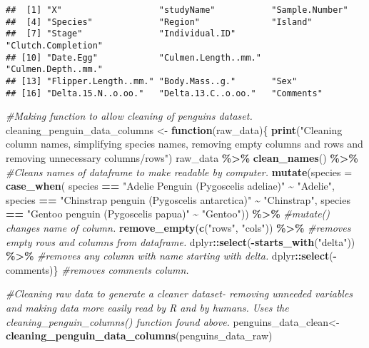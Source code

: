 \documentclass[
]{article}
\newenvironment{Shaded}{\begin{snugshade}}{\end{snugshade}}
\newcommand{\AttributeTok}[1]{\textcolor[rgb]{0.13,0.29,0.53}{#1}}
\newcommand{\CommentTok}[1]{\textcolor[rgb]{0.56,0.35,0.01}{\textit{#1}}}
\newcommand{\ControlFlowTok}[1]{\textcolor[rgb]{0.13,0.29,0.53}{\textbf{#1}}}
\newcommand{\FunctionTok}[1]{\textcolor[rgb]{0.13,0.29,0.53}{\textbf{#1}}}
\newcommand{\NormalTok}[1]{#1}
\newcommand{\OtherTok}[1]{\textcolor[rgb]{0.56,0.35,0.01}{#1}}
\newcommand{\SpecialCharTok}[1]{\textcolor[rgb]{0.81,0.36,0.00}{\textbf{#1}}}
\newcommand{\StringTok}[1]{\textcolor[rgb]{0.31,0.60,0.02}{#1}}
\begin{document}
\begin{verbatim}
##  [1] "X"                   "studyName"           "Sample.Number"      
##  [4] "Species"             "Region"              "Island"             
##  [7] "Stage"               "Individual.ID"       "Clutch.Completion"  
## [10] "Date.Egg"            "Culmen.Length..mm."  "Culmen.Depth..mm."  
## [13] "Flipper.Length..mm." "Body.Mass..g."       "Sex"                
## [16] "Delta.15.N..o.oo."   "Delta.13.C..o.oo."   "Comments"
\end{verbatim}

\begin{Shaded}
\begin{Highlighting}[]
\CommentTok{\#Making function to allow cleaning of penguins dataset.}
\NormalTok{cleaning\_penguin\_data\_columns }\OtherTok{\textless{}{-}} \ControlFlowTok{function}\NormalTok{(raw\_data)\{}
  \FunctionTok{print}\NormalTok{(}\StringTok{"Cleaning column names, simplifying species names, removing empty columns and rows and removing unnecessary columns/rows"}\NormalTok{)}
\NormalTok{  raw\_data }\SpecialCharTok{\%\textgreater{}\%} 
    \FunctionTok{clean\_names}\NormalTok{() }\SpecialCharTok{\%\textgreater{}\%} \CommentTok{\#Cleans names of dataframe to make readable by computer.}
    \FunctionTok{mutate}\NormalTok{(}\AttributeTok{species =} \FunctionTok{case\_when}\NormalTok{(}
\NormalTok{      species }\SpecialCharTok{==} \StringTok{"Adelie Penguin (Pygoscelis adeliae)"} \SpecialCharTok{\textasciitilde{}} \StringTok{"Adelie"}\NormalTok{,}
\NormalTok{      species }\SpecialCharTok{==} \StringTok{"Chinstrap penguin (Pygoscelis antarctica)"} \SpecialCharTok{\textasciitilde{}} \StringTok{"Chinstrap"}\NormalTok{,}
\NormalTok{      species }\SpecialCharTok{==} \StringTok{"Gentoo penguin (Pygoscelis papua)"} \SpecialCharTok{\textasciitilde{}} \StringTok{"Gentoo"}\NormalTok{)) }\SpecialCharTok{\%\textgreater{}\%} \CommentTok{\#mutate() changes name of column.}
    \FunctionTok{remove\_empty}\NormalTok{(}\FunctionTok{c}\NormalTok{(}\StringTok{"rows"}\NormalTok{, }\StringTok{"cols"}\NormalTok{)) }\SpecialCharTok{\%\textgreater{}\%} \CommentTok{\#removes empty rows and columns from dataframe.}
\NormalTok{    dplyr}\SpecialCharTok{::}\FunctionTok{select}\NormalTok{(}\SpecialCharTok{{-}}\FunctionTok{starts\_with}\NormalTok{(}\StringTok{"delta"}\NormalTok{)) }\SpecialCharTok{\%\textgreater{}\%} \CommentTok{\#removes any column with name starting with delta.}
\NormalTok{    dplyr}\SpecialCharTok{::}\FunctionTok{select}\NormalTok{(}\SpecialCharTok{{-}}\NormalTok{comments)\} }\CommentTok{\#removes comments column.}

\CommentTok{\#Cleaning raw data to generate a cleaner dataset{-} removing unneeded variables and making data more easily read by R and by humans. Uses the cleaning\_penguin\_columns() function found above.}
\NormalTok{penguins\_data\_clean}\OtherTok{\textless{}{-}}\FunctionTok{cleaning\_penguin\_data\_columns}\NormalTok{(penguins\_data\_raw)}
\end{Highlighting}
\end{Shaded}
\end{document}
